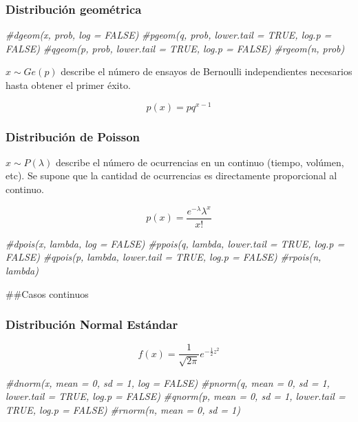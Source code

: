 \documentclass[]{article}
\newenvironment{Shaded}{\begin{snugshade}}{\end{snugshade}}
\newcommand{\CommentTok}[1]{\textcolor[rgb]{0.56,0.35,0.01}{\textit{#1}}}
\begin{document}
\hypertarget{distribucion-geometrica}{%
\subsubsection{Distribución geométrica}\label{distribucion-geometrica}}

\begin{Shaded}
\begin{Highlighting}[]
\CommentTok{#dgeom(x, prob, log = FALSE)}
\CommentTok{#pgeom(q, prob, lower.tail = TRUE, log.p = FALSE)}
\CommentTok{#qgeom(p, prob, lower.tail = TRUE, log.p = FALSE)}
\CommentTok{#rgeom(n, prob)}
\end{Highlighting}
\end{Shaded}

\(x \sim Ge(p)\) describe el número de ensayos de Bernoulli
independientes necesarios hasta obtener el primer éxito.

\[p(x) = pq^{x-1}\]

\hypertarget{distribucion-de-poisson}{%
\subsubsection{Distribución de Poisson}\label{distribucion-de-poisson}}

\(x \sim P(\lambda)\) describe el número de ocurrencias en un continuo
(tiempo, volúmen, etc). Se supone que la cantidad de ocurrencias es
directamente proporcional al continuo.

\[p(x) = \frac{e^{- \lambda} \lambda^x}{x!}\]

\begin{Shaded}
\begin{Highlighting}[]
\CommentTok{#dpois(x, lambda, log = FALSE)}
\CommentTok{#ppois(q, lambda, lower.tail = TRUE, log.p = FALSE)}
\CommentTok{#qpois(p, lambda, lower.tail = TRUE, log.p = FALSE)}
\CommentTok{#rpois(n, lambda)}
\end{Highlighting}
\end{Shaded}

\#\#Casos continuos

\hypertarget{distribucion-normal-estandar}{%
\subsubsection{Distribución Normal
Estándar}\label{distribucion-normal-estandar}}

\[ f(x) = \frac{1}{\sqrt{2 \pi}} e^{-\frac{1}{2}z^2} \]

\begin{Shaded}
\begin{Highlighting}[]
\CommentTok{#dnorm(x, mean = 0, sd = 1, log = FALSE)}
\CommentTok{#pnorm(q, mean = 0, sd = 1, lower.tail = TRUE, log.p = FALSE)}
\CommentTok{#qnorm(p, mean = 0, sd = 1, lower.tail = TRUE, log.p = FALSE)}
\CommentTok{#rnorm(n, mean = 0, sd = 1)}
\end{Highlighting}
\end{Shaded}
\end{document}
